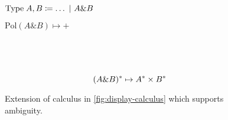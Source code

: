 \begin{figure}
  \begin{mdframed}
    \centering
    \vspace*{1\baselineskip}
    \begin{minipage}{0.666\linewidth}
      \centering
      \(\text{Type}\;A,B\coloneqq\ldots\vsep A\& B\)
    \end{minipage}%
    \begin{minipage}{0.333\linewidth}
      \centering
      \(\text{Pol}(A \& B) \mapsto {+}\)
    \end{minipage}
    \\[1\baselineskip]
    \begin{pfbox}
    \end{pfbox}
    \begin{pfbox}
    \end{pfbox}
    \begin{pfbox}
    \end{pfbox}
    \\[1\baselineskip]
    \hrulefill
    \[
      \tr[(A\& B)] \mapsto \tr[A]\times\tr[B]
    \]
    \begin{pfblock}
    \end{pfblock}
    \begin{pfblock}
    \end{pfblock}
    \begin{pfblock}
    \end{pfblock}
    \vspace*{0.5\baselineskip}
  \end{mdframed}
  \caption{
    Extension of calculus in \autoref{fig:display-calculus} which
    supports ambiguity.}%
  \label{fig:extension-lexical-ambiguity}
\end{figure}
%
